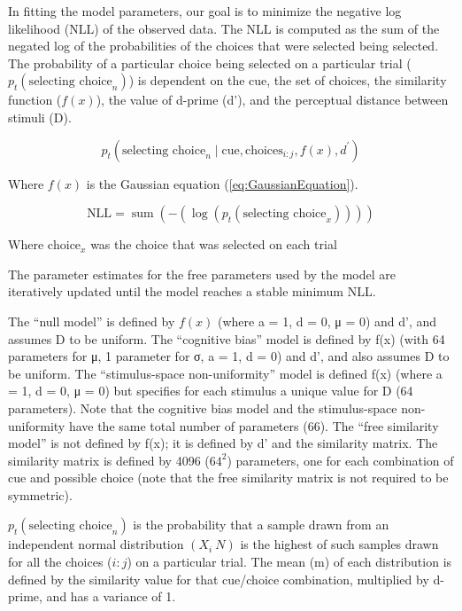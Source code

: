 In fitting the model parameters, our goal is to minimize the negative log likelihood (NLL) of the observed data. 
The NLL is computed as the sum of the negated log of the probabilities of the choices that were selected being selected. 
The probability of a particular choice being selected on a particular trial ($p_t(\text{selecting choice}_n)$) is dependent on the cue, the set of choices, the similarity function ($f(x)$), the value of d-prime (d’), and the perceptual distance between stimuli (D).

\begin{equation} \label{eq:pt}
    p_t\left(\text{selecting choice}_n \mid \text{cue},\text{choices}_{i:j}, f(x), d^{\prime}\right)
\end{equation}

Where $f(x)$ is the Gaussian equation (\autoref{eq:GaussianEquation}).

\begin{equation}
    \text{NLL} = \operatorname{sum}\left(-\left(\log \left(p_t\left(\text {selecting choice}_x\right)\right)\right)\right)
\end{equation}

Where $\text{choice}_x$ was the choice that was selected on each trial

The parameter estimates for the free parameters used by the model are iteratively updated until the model reaches a stable minimum NLL. 

The “null model” is defined by $f(x)$ (where a = 1, d = 0, μ = 0) and d’, and assumes D to be uniform. 
The “cognitive bias” model is defined by f(x) (with 64 parameters for μ, 1 parameter for σ, a = 1, d = 0) and d’, and also assumes D to be uniform. 
The “stimulus-space non-uniformity” model is defined f(x) (where a = 1, d = 0, μ = 0) but specifies for each stimulus a unique value for D (64 parameters). 
Note that the cognitive bias model and the stimulus-space non-uniformity have the same total number of parameters (66). 
The “free similarity model” is not defined by f(x); it is defined by d’ and the similarity matrix. 
The similarity matrix is defined by 4096 ($64^2$) parameters, one for each combination of cue and possible choice (note that the free similarity matrix is not required to be symmetric).

$p_t(\text{selecting choice}_n)$ is the probability that a sample drawn from an independent normal distribution $(X_i ~ N)$ is the highest of such samples drawn for all the choices ($i:j$) on a particular trial. 
The mean (m) of each distribution is defined by the similarity value for that cue/choice combination, multiplied by d-prime, and has a variance of 1.

